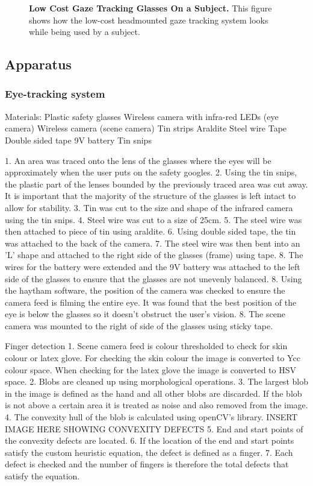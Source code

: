 \documentclass[jou,a4paper,notxfonts]{apa}
\begin{document}
\begin{figure}[tp]
 \caption{\textbf{Low Cost Gaze Tracking Glasses On a Subject.} This figure shows how the low-cost headmounted gaze
 tracking system looks while being used by a subject.}
 \label{gazeTrackingGlasses}
\end{figure}


\subsection{Apparatus}
\subsubsection{Eye-tracking system}

Materials:
Plastic safety glasses
Wireless camera with infra-red LEDs (eye camera)
Wireless camera	(scene camera)
Tin strips
Araldite
Steel wire
Tape
Double sided tape
9V battery
Tin snips

1. An area was traced onto the lens of the glasses where the eyes will be approximately when the user puts on the safety googles. 
2. Using the tin snips, the plastic part of the lenses bounded by the previously traced area was cut away. It is important that the
majority of the structure of the glasses is left intact to allow for stability.
3. Tin was cut to the size and shape of the infrared camera using the tin snips.
4. Steel wire was cut to a size of 25cm.
5. The steel wire was then attached to piece of tin using araldite.
6. Using double sided tape, the tin was attached to the back of the camera.
7. The steel wire was then bent into an 'L' shape and attached to the right side of the glasses (frame) using tape.
8. The wires for the battery were extended and the 9V battery was attached to the left side of the glasses to ensure that the glasses
are not unevenly balanced.
8. Using the haytham software, the position of the camera was checked to ensure the camera feed is filming the entire eye.
It was found that the best position of the eye is below the glasses so it doesn't obstruct the user's vision. 
8. The scene camera was mounted to the right of side of the glasses using sticky tape.

Finger detection
1. Scene camera feed is colour thresholded to check for skin colour or latex glove. For checking the skin colour the image is 
converted to Ycc colour space. When checking for the latex glove the image is converted to HSV space.
2. Blobs are cleaned up using morphological operations.
3. The largest blob in the image is defined as the hand and all other blobs are discarded. If the blob is not above a certain area
it is treated as noise and also removed from the image.
4. The convexity hull of the blob is calculated using openCV's library.
INSERT IMAGE HERE SHOWING CONVEXITY DEFECTS
5. End and start points of the convexity defects are located.
6. If the location of the end and start points satisfy the custom heuristic equation, the defect is defined as a finger.
7. Each defect is checked and the number of fingers is therefore the total defects that satisfy the equation.
\end{document}
